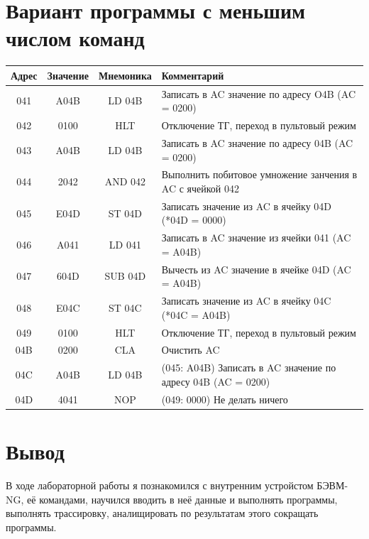 \documentclass[11pt]{article}
\begin{document}
\section{Вариант программы с меньшим числом команд}
\label{sec:org0f19ad0}
\begin{center}
\begin{tabular}{|c|c|c|l|}
\hline
Адрес & Значение & Мнемоника & Комментарий\\
\hline
041 & A04B & LD 04B & Записать в AC значение по адресу O4B (AC = 0200)\\
042 & 0100 & HLT & Отключение ТГ, переход в пультовый режим\\
\hline
043 & A04B & LD 04B & Записать в AC значение по адресу 04B (AC = 0200)\\
044 & 2042 & AND 042 & Выполнить побитовое умножение занчения в AC с ячейкой 042\\
045 & E04D & ST 04D & Записать значение из AC в ячейку 04D  (*04D = 0000)\\
046 & A041 & LD 041 & Записать в AC значение из ячейки 041 (AC = A04B)\\
047 & 604D & SUB 04D & Вычесть из AC значение в ячейке 04D (AC = A04B)\\
048 & E04C & ST 04C & Записать значение из AC в ячейку 04C (*04C = A04B)\\
049 & 0100 & HLT & Отключение ТГ, переход в пультовый режим\\
04B & 0200 & CLA & Очистить AC\\
04C & A04B & LD 04B & (045: A04B) Записать в AC значение по адресу 04B (AC = 0200)\\
04D & 4041 & NOP & (049: 0000) Не делать ничего\\
\hline
\end{tabular}
\end{center}

\section{Вывод}
\label{sec:org7d63bec}
В ходе лабораторной работы я познакомился с внутренним устройстом БЭВМ-NG, её командами, научился вводить в неё данные и выполнять программы, выполнять трассировку, аналищировать по результатам этого сокращать программы.
\end{document}
